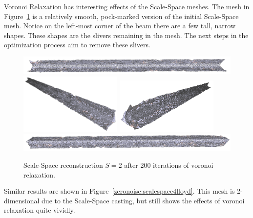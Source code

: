 \documentclass[12pt]{drexelthesis}
\begin{document}
Voronoi Relaxation has interesting effects of the Scale-Space meshes. The mesh in Figure~\ref{zeronoise:scalespace2lloyd} is a relatively smooth, pock-marked version of the initial Scale-Space mesh. Notice on the left-most corner of the beam there are a few tall, narrow shapes. These shapes are the slivers remaining in the mesh. The next steps in the optimization process aim to remove these slivers.

\begin{figure}[!ht]
	
	\centering
		\includegraphics[width=5in]{simulated-lab-scan/0noise/optimizedNeat/scalespace2lloyd00.png}
		\includegraphics[width=2in]{simulated-lab-scan/0noise/optimizedNeat/scalespace2lloyd01.png}
		\includegraphics[width=2in]{simulated-lab-scan/0noise/optimizedNeat/scalespace2lloyd02.png}
		\includegraphics[width=5in]{simulated-lab-scan/0noise/optimizedNeat/scalespace2lloyd03.png}
		\caption[Scale-Space reconstruction $S = 2$ after 200 iterations of voronoi relaxation]{\centering Scale-Space reconstruction $S = 2$ after 200 iterations of voronoi relaxation.}
	\label{zeronoise:scalespace2lloyd}
\end{figure}

Similar results are shown in Figure~\ref{zeronoise:scalespace4lloyd}. This mesh is 2-dimensional due to the Scale-Space casting, but still shows the effects of voronoi relaxation quite vividly.
\end{document}
